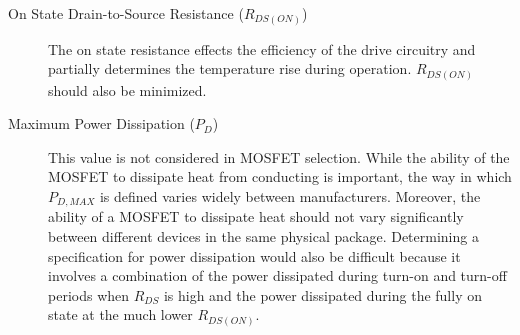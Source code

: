 \documentclass{article}
\begin{document}
\begin{description}
\item[On State Drain-to-Source Resistance ($R_{DS(ON)}$)] The on state resistance effects the efficiency of the drive circuitry and partially determines the temperature rise during operation. $R_{DS(ON)}$ should also be minimized.

 \item[Maximum Power Dissipation ($P_D$)] This value is not considered in MOSFET selection. While the ability of the MOSFET to dissipate heat from conducting is important, the way in which $P_{D,MAX}$ is defined varies widely between manufacturers. Moreover, the ability of a MOSFET to dissipate heat should not vary significantly between different devices in the same physical package. Determining a specification for power dissipation would also be difficult because it involves a combination of the power dissipated during turn-on and turn-off periods when $R_{DS}$ is high and the power dissipated during the fully on state at the much lower $R_{DS(ON)}$.
\end{description}
\end{document}
